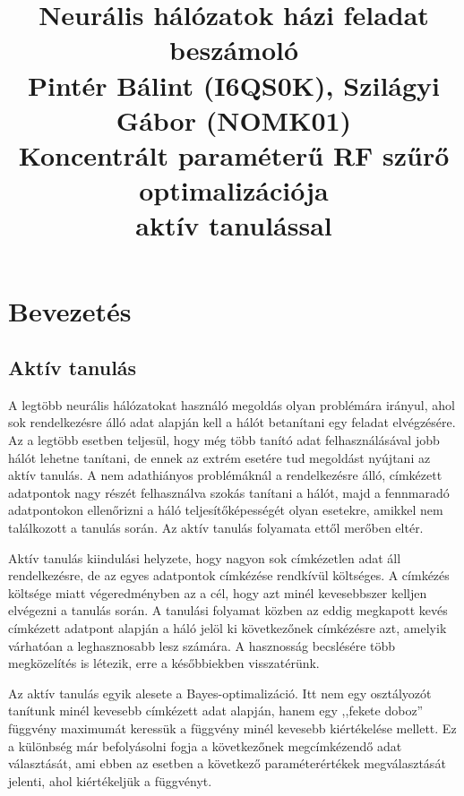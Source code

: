 \newcommand\vect[1]{\underline{#1}}
\newcommand\mat[1]{\underline{\underline{#1}}}

\title{
    \huge{Neurális hálózatok házi feladat beszámoló} \\
	\vspace*{2cm}
	\large{Pintér Bálint (I6QS0K), Szilágyi Gábor (NOMK01)}\\
	\vspace*{2cm}
	\Large{Koncentrált paraméterű RF szűrő optimalizációja \\ aktív tanulással}
}


\maketitle
\tableofcontents
\section{Bevezetés}
	\subsection{Aktív tanulás}
		A legtöbb neurális hálózatokat használó megoldás olyan problémára irányul, ahol sok rendelkezésre álló adat alapján kell a hálót betanítani egy feladat elvégzésére. Az a legtöbb esetben teljesül, hogy még több tanító adat felhasználásával jobb hálót lehetne tanítani, de ennek az extrém esetére tud megoldást nyújtani az aktív tanulás. A nem adathiányos problémáknál a rendelkezésre álló, címkézett adatpontok nagy részét felhasználva szokás tanítani a hálót, majd a fennmaradó adatpontokon ellenőrizni a háló teljesítőképességét olyan esetekre, amikkel nem találkozott a tanulás során. Az aktív tanulás folyamata ettől merőben eltér.

		Aktív tanulás kiindulási helyzete, hogy nagyon sok címkézetlen adat áll rendelkezésre, de az egyes adatpontok címkézése rendkívül költséges. A címkézés költsége miatt végeredményben az a cél, hogy azt minél kevesebbszer kelljen elvégezni a tanulás során. A tanulási folyamat közben az eddig megkapott kevés címkézett adatpont alapján a háló jelöl ki következőnek címkézésre azt, amelyik várhatóan a leghasznosabb lesz számára. A hasznosság becslésére több megközelítés is létezik, erre a későbbiekben visszatérünk.

		Az aktív tanulás egyik alesete a Bayes-optimalizáció. Itt nem egy osztályozót tanítunk minél kevesebb címkézett adat alapján, hanem egy ,,fekete doboz'' függvény maximumát keressük a függvény minél kevesebb kiértékelése mellett. Ez a különbség már befolyásolni fogja a következőnek megcímkézendő adat választását, ami ebben az esetben a következő paraméterértékek megválasztását jelenti, ahol kiértékeljük a függvényt.
